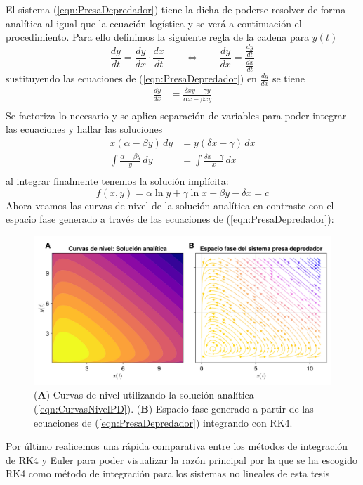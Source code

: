 El sistema (\ref{eqn:PresaDepredador}) tiene la dicha de poderse resolver de forma analítica al igual que la ecuación logística y se verá a continuación el procedimiento. Para ello definimos la siguiente regla de la cadena para $y(t)$
$$\frac{dy}{dt} = \frac{dy}{dx}\cdot\frac{dx}{dt}\qquad\Longleftrightarrow\qquad\frac{dy}{dx}=\frac{\frac{dy}{dt}}{\frac{dx}{dt}}$$
sustituyendo las ecuaciones de (\ref{eqn:PresaDepredador}) en $\frac{dy}{dx}$ se tiene
\begin{align*}
	\frac{dy}{dx}&=\frac{\delta xy-\gamma y}{\alpha x-\beta xy}  \\
\end{align*}
Se factoriza lo necesario y se aplica separación de variables para poder integrar las ecuaciones y hallar las soluciones
\begin{align*}
	x(\alpha-\beta y)\, dy &= y(\delta x-\gamma)\, dx\\
	\int \frac{\alpha-\beta y}{y}\, dy &= \int \frac{\delta x-\gamma}{x}\, dx \\
\end{align*}
al integrar finalmente tenemos la solución implícita:
\begin{equation}\label{eqn:CurvasNivelPD}
	f(x,y)=\alpha\ln y+\gamma\ln x-\beta y- \delta x=c
\end{equation}
Ahora veamos las curvas de nivel de la solución analítica en contraste con el espacio fase generado a través de las ecuaciones de (\ref{eqn:PresaDepredador}):
\begin{figure}[h!]
	\centering
	\includegraphics[scale=0.22]{../Imagenes/Curvas de nivel PD}
	\caption{(\textbf{A}) Curvas de nivel utilizando la solución analítica (\ref{eqn:CurvasNivelPD}). (\textbf{B}) Espacio fase generado a partir de las ecuaciones de (\ref{eqn:PresaDepredador}) integrando con RK4.}
	\label{fig:CurvasNivelPD}
\end{figure}
\newpage
Por último realicemos una rápida comparativa entre los métodos de integración de RK4 y Euler para poder visualizar la razón principal por la que se ha escogido RK4 como método de integración para los sistemas no lineales de esta tesis
